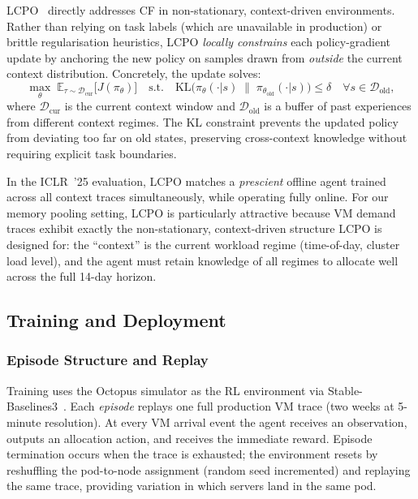 \documentclass[11pt]{article}
\begin{document}
LCPO~\cite{hamadanian2025lcpo} directly addresses CF in non-stationary,
context-driven environments.  Rather than relying on task labels (which
are unavailable in production) or brittle regularisation heuristics, LCPO
\emph{locally constrains} each policy-gradient update by anchoring the new
policy on samples drawn from \emph{outside} the current context
distribution.  Concretely, the update solves:
\[
    \max_\theta \; \mathbb{E}_{\tau \sim \mathcal{D}_{\text{cur}}}
        \bigl[J(\pi_\theta)\bigr]
    \quad \text{s.t.} \quad
    \mathrm{KL}\!\bigl(\pi_\theta(\cdot|s) \;\|\; \pi_{\theta_{\text{old}}}(\cdot|s)\bigr)
    \le \delta
    \quad \forall s \in \mathcal{D}_{\text{old}},
\]
where $\mathcal{D}_{\text{cur}}$ is the current context window and
$\mathcal{D}_{\text{old}}$ is a buffer of past experiences from different
context regimes.  The KL constraint prevents the updated policy from
deviating too far on old states, preserving cross-context knowledge without
requiring explicit task boundaries.

In the ICLR~'25 evaluation, LCPO matches a \emph{prescient} offline agent
trained across all context traces simultaneously, while operating fully
online.  For our memory pooling setting, LCPO is particularly attractive
because VM demand traces exhibit exactly the non-stationary, context-driven
structure LCPO is designed for: the ``context'' is the current workload
regime (time-of-day, cluster load level), and the agent must retain
knowledge of all regimes to allocate well across the full 14-day horizon.

\subsection{Training and Deployment}
\label{sec:training}

\subsubsection*{Episode Structure and Replay}

Training uses the Octopus simulator as the RL environment via
Stable-Baselines3~\cite{stable_baselines3}.  Each \emph{episode} replays
one full production VM trace (two weeks at 5-minute resolution).  At every
VM arrival event the agent receives an observation, outputs an allocation
action, and receives the immediate reward.  Episode termination occurs when
the trace is exhausted; the environment resets by reshuffling the pod-to-node
assignment (random seed incremented) and replaying the same trace, providing
variation in which servers land in the same pod.
\end{document}
